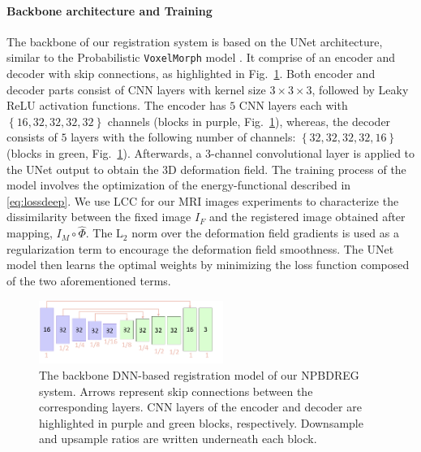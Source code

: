 \documentclass[preprint,authoryear]{elsarticle}
\begin{document}
\paragraph{Backbone architecture and Training}
The backbone of our registration system is based on the UNet architecture, similar to the Probabilistic \texttt{VoxelMorph} model \cite{dalca2018varreg}. It  comprise of an encoder and decoder with skip connections, as highlighted in Fig.~\ref{fig:netarch}. Both encoder and decoder parts consist of CNN layers with kernel size $3\times3\times3$, followed by Leaky ReLU activation functions. The encoder has $5$ CNN layers each with $\left\{16,32,32,32,32\right\}$ channels (blocks in purple, Fig.~\ref{fig:netarch}), whereas, the decoder consists of $5$ layers with the following number of channels: $\left\{32,32,32,32,16\right\}$ (blocks in green, Fig.~\ref{fig:netarch}). Afterwards, a 3-channel convolutional layer is applied to the UNet output to obtain the 3D deformation field.
The training process of the model involves the optimization of the energy-functional described in \eqref{eq:lossdeep}. We use LCC for our MRI images experiments to characterize the dissimilarity between the fixed image $I_{F}$ and the registered image obtained after mapping, $I_{M}\circ\hat{\Phi}$. The $\text{L}_{2}$ norm over the deformation field gradients is used as a regularization term to encourage the deformation field smoothness. The UNet model then learns the optimal weights by minimizing the loss function composed of the two aforementioned terms.   
\begin{figure}
    \centering
    \includegraphics[width=6cm]{Network_Arch.png}
    \caption{The backbone DNN-based registration model of our NPBDREG system. Arrows represent skip connections between the corresponding layers. CNN layers of the encoder and decoder are highlighted in purple and green blocks, respectively. Downsample and upsample ratios are written underneath each block.}
    \label{fig:netarch}
\end{figure}
\end{document}
